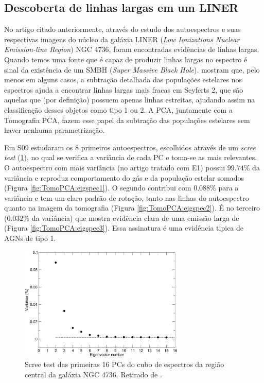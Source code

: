 \subsection{Descoberta de linhas largas em um LINER}

No artigo citado anteriormente, através do estudo dos autoespectros e suas respectivas imagens do núcleo da galáxia
LINER ({\em Low Ionizations Nuclear Emission-line Region}) NGC 4736, foram encontradas evidências de linhas largas.
Quando temos uma fonte que é capaz de produzir linhas largas no espectro é sinal da existência de um SMBH ({\em Super
Massive Black Hole}). \citet{CidFernandes2004} mostram que, pelo menos em alguns casos, a subtração detalhada das
populações estelares nos espectros ajuda a encontrar linhas largas mais fracas em Seyferts 2, que são aquelas que (por
definição) possuem apenas linhas estreitas, ajudando assim na classificação desses objetos como tipo 1 ou 2. A PCA,
juntamente com a Tomografia PCA, fazem esse papel da subtração das populações estelares sem haver nenhuma
parametrização.

Em S09 estudaram os 8 primeiros autoespectros, escolhidos através de um {\em scree test} (\ref{fig:TomoPCA:scree}), no
qual se verifica a variância de cada PC e toma-se as mais relevantes. O autoespectro com mais variância (no artigo
tratado com E1) possui $99.74\%$ da variância e reproduz comportamento do gás e da população estelar somados (Figura
\ref{fig:TomoPCA:eigspec1}). O segundo contribui com $0.088\%$ para a variância e tem um claro padrão de rotação, tanto
nas linhas do autoespectro quanto na imagem da tomografia (Figura \ref{fig:TomoPCA:eigspec2}). É no terceiro ($0.032\%$
da variância) que mostra evidência clara de uma emissão larga de \Halpha (Figura \ref{fig:TomoPCA:eigspec3}). Essa
assinatura é uma evidência tipica de AGNs de tipo 1.

\begin{figure}
    \includegraphics[width=0.7\textwidth]{figuras/figSteiner2009fig1.pdf}
    \caption[{\em Scree test} na galáxia NGC 4736.]
    {Scree test das primeiras 16 PCs do cubo de espectros da região
    central da galáxia NGC 4736. 
    Retirado de \citet[][fig. 1]{Steiner2009}.}
    \label{fig:TomoPCA:scree}
\end{figure}

